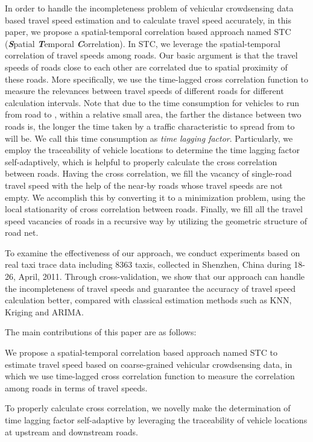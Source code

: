 \documentclass[twocolumn,10pt,final,conference]{IEEEtran}
\begin{document}
In order to handle the incompleteness problem of vehicular crowdsensing data based travel speed estimation and to calculate travel speed accurately, in this paper, we propose a spatial-temporal correlation based approach named STC (\emph{\bf{S}}patial \emph{\bf{T}}emporal \emph{\bf{C}}orrelation). In STC, we leverage the spatial-temporal correlation of travel speeds among roads. Our basic argument is that the  travel speeds of roads close to each other are correlated due to spatial proximity of these roads. More specifically, we use the time-lagged cross correlation function to measure the relevances between travel speeds of different roads for different calculation intervals. Note that due to the time consumption for vehicles to run from road  to , within a relative small area, the farther the distance between two roads is, the longer the time taken by a traffic characteristic to spread from  to  will be. We call this time consumption as \emph{time lagging factor}. Particularly, we employ the traceability of vehicle locations to determine the time lagging factor self-adaptively, which is helpful to properly calculate the cross correlation between roads. Having the cross correlation, we fill the vacancy of single-road travel speed with the help of the near-by roads whose travel speeds are not empty. We accomplish this by converting it to a minimization problem, using the local stationarity of cross correlation between roads. Finally, we fill all the travel speed vacancies of roads in a recursive way by utilizing the geometric structure of road net.

To examine the effectiveness of our approach, we conduct experiments based on real taxi trace data including 8363 taxis, collected in Shenzhen, China during 18-26, April, 2011. Through cross-validation, we show that our approach can handle the incompleteness of travel speeds and guarantee the accuracy of travel speed calculation better, compared with classical estimation methods such as KNN, Kriging and ARIMA.

The main contributions of this paper are as follows:

We propose a spatial-temporal correlation based approach named STC to estimate travel speed based on coarse-grained vehicular crowdsensing data, in which we use time-lagged cross correlation function to measure the correlation among roads in terms of travel speeds.

To properly calculate cross correlation, we novelly  make the determination of time lagging factor self-adaptive by leveraging the traceability of vehicle locations at upstream and downstream roads.
\end{document}
